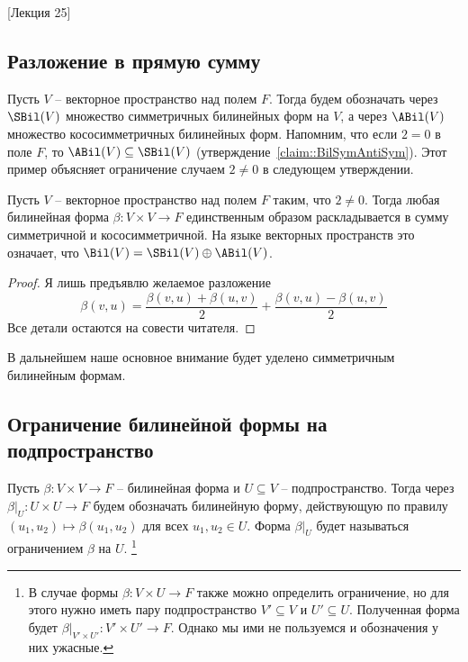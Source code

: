 [Лекция 25]


\subsection{Разложение в прямую сумму}

Пусть $V$ -- векторное пространство над полем $F$.
Тогда будем обозначать через $\SBil(V)$ множество симметричных билинейных форм на $V$, а через $\ABil(V)$ множество кососимметричных билинейных форм.
Напомним, что если $2 = 0$ в поле $F$, то $\ABil(V)\subseteq \SBil(V)$ (утверждение~\ref{claim::BilSymAntiSym}).
Этот пример объясняет ограничение случаем $2 \neq 0$ в следующем утверждении.

\begin{claim}
\label{claim::BilDirectSA}
Пусть $V$ -- векторное пространство над полем $F$ таким, что $2 \neq 0$.
Тогда любая билинейная форма $\beta\colon V\times V\to F$ единственным образом раскладывается в сумму симметричной и кососимметричной.
На языке векторных пространств это означает, что $\Bil(V) = \SBil(V) \oplus \ABil(V)$.
\end{claim}
\begin{proof}
Я лишь предъявлю желаемое разложение 
\[
\beta(v,u) = \frac{\beta(v,u) + \beta(u, v)}{2} + \frac{\beta(v,u) - \beta(u,v)}{2}
\]
Все детали остаются на совести читателя.
\end{proof}

В дальнейшем наше основное внимание будет уделено симметричным билинейным формам.


\subsection{Ограничение билинейной формы на подпространство}

\begin{definition}
Пусть $\beta\colon V\times V\to F$ -- билинейная форма и $U\subseteq V$ -- подпространство.
Тогда через $\beta|_U\colon U\times U\to F$ будем обозначать билинейную форму, действующую по правилу $(u_1, u_2)\mapsto \beta(u_1, u_2)$ для всех $u_1,u_2\in U$.
Форма $\beta|_U$ будет называться ограничением $\beta$ на $U$.%
\footnote{В случае формы $\beta\colon V\times U\to F$ также можно определить ограничение, но для этого нужно иметь пару подпространство $V'\subseteq V$ и $U'\subseteq U$.
Полученная форма будет $\beta|_{V'\times U'}\colon V'\times U' \to F$.
Однако мы ими не пользуемся и обозначения у них ужасные.}
\end{definition}

